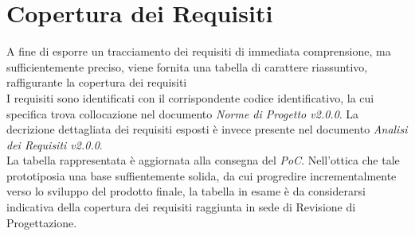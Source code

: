 \section{Copertura dei Requisiti} \label{Req}
A fine di esporre un tracciamento dei requisiti di immediata comprensione, ma sufficientemente preciso, viene fornita una tabella di carattere riassuntivo, raffigurante la copertura dei requisiti\\ 
I requisiti sono identificati con il corrispondente codice identificativo, la cui specifica trova collocazione nel documento \textit{Norme di Progetto v2.0.0}. La decrizione dettagliata dei requisiti esposti è invece presente nel documento \textit{Analisi dei Requisiti v2.0.0}.\\
La tabella rappresentata è aggiornata alla consegna del \textit{PoC}\glossario. Nell'ottica che tale prototipo\glossario sia una base suffientemente solida, da cui progredire incrementalmente verso lo sviluppo del prodotto finale, la tabella in esame è da considerarsi indicativa della copertura dei requisiti raggiunta in sede di Revisione di Progettazione.\\

